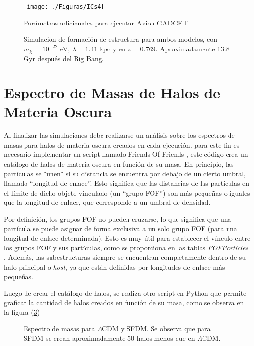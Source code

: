 \documentclass[a4paper,openright,12pt]{book}
\begin{document}
\begin{figure}
\centering \texttt{[image: ./Figuras/ICs4]}
\caption{\footnotesize{Parámetros adicionales para ejecutar Axion-GADGET.}}
\label{fig 4.2}
\end{figure}

\begin{figure}[htpb]
\centering
{}
\caption{\footnotesize{Simulación de formación de estructura para ambos modelos, con $m_{\chi} = 10^{-22}$ eV, $\lambda=1.41$ kpc y en $z=0.769$. Aproximadamente 13.8 Gyr después del Big Bang.}} \label{fig 4.3}
\end{figure}

\section{Espectro de Masas de Halos de Materia Oscura}
Al finalizar las simulaciones debe realizarse un análisis sobre los espectros de masas para halos de materia oscura creados en cada ejecución, para este fin es necesario implementar un script llamado Friends Of Friends \cite{4.4}, este código crea un catálogo de halos de materia oscura en función de su masa. En principio, las partículas se "unen" si su distancia se encuentra por debajo de un cierto umbral, llamado ``longitud de enlace''. Esto significa que las distancias de las partículas en el límite de dicho objeto vinculado (un ``grupo FOF'') son más pequeñas o iguales que la longitud de enlace, que corresponde a un umbral de densidad. 

Por definición, los grupos FOF no pueden cruzarse, lo que significa que una partícula se puede asignar de forma exclusiva a un solo grupo FOF (para una longitud de enlace determinada). Esto es muy útil para establecer el vínculo entre los grupos FOF y sus partículas, como se proporciona en las tablas \textit{FOFParticles} . Además, las subestructuras siempre se encuentran completamente dentro de su halo principal o \textit{host}, ya que están definidas por longitudes de enlace más pequeñas.

Luego de crear el catálogo de halos, se realiza otro script en Python que permite graficar la cantidad de halos creados en función de su masa,  como se observa en la figura (\ref{fig 4.4})
\begin{figure}[htpb]
\centering
{}
\caption{\footnotesize{Espectro de masas para $\Lambda$CDM y SFDM. Se observa que para SFDM se crean aproximadamente 50 halos menos que en $\Lambda$CDM.}} \label{fig 4.4}
\end{figure}
\end{document}
